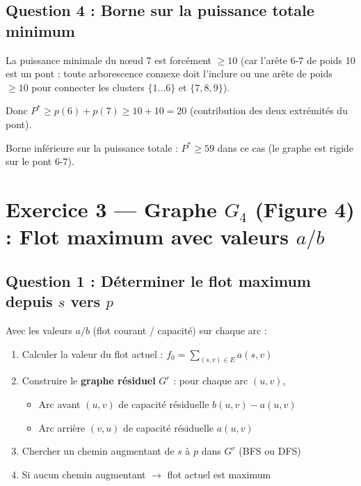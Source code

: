 \documentclass[12pt,a4paper]{article}
\begin{document}
\subsection{Question 4 : Borne sur la puissance totale minimum}

\begin{solution}
La puissance minimale du nœud 7 est forcément $\ge 10$ (car l'arête $6$-$7$ de poids 10 est un pont : toute arborescence connexe doit l'inclure ou une arête de poids $\ge 10$ pour connecter les clusters $\{1\ldots6\}$ et $\{7,8,9\}$).

Donc $P^* \ge p(6) + p(7) \ge 10 + 10 = 20$ (contribution des deux extrémités du pont).

Borne inférieure sur la puissance totale : $P^* \ge 59$ dans ce cas (le graphe est rigide sur le pont $6$-$7$).
\end{solution}

\newpage
\section{Exercice 3 --- Graphe $G_4$ (Figure 4) : Flot maximum avec valeurs $a/b$}

\subsection{Question 1 : Déterminer le flot maximum depuis $s$ vers $p$}

\begin{methode}
Avec les valeurs $a/b$ (flot courant / capacité) sur chaque arc :
\begin{enumerate}
    \item Calculer la valeur du flot actuel : $f_0 = \sum_{(s,v) \in E} a(s,v)$
    \item Construire le \textbf{graphe résiduel} $G^r$ : pour chaque arc $(u,v)$, 
        \begin{itemize}
            \item Arc avant $(u,v)$ de capacité résiduelle $b(u,v) - a(u,v)$
            \item Arc arrière $(v,u)$ de capacité résiduelle $a(u,v)$
        \end{itemize}
    \item Chercher un chemin augmentant de $s$ à $p$ dans $G^r$ (BFS ou DFS)
    \item Si aucun chemin augmentant $\to$ flot actuel est maximum
\end{enumerate}
\end{methode}
\end{document}
